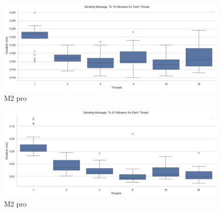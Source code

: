 \documentclass[a4paper]{article}
\begin{document}
\begin{figure}[H]
	\centering
	\includegraphics[width = \linewidth]{Images/SendingMessageBox10Follower.png}
	\caption{M2 pro}
\end{figure}

\begin{figure}[H]
	\centering
	\includegraphics[width = \linewidth]{Images/SendingMessageBox20Follower.png}
	\caption{M2 pro}
\end{figure}
\end{document}
